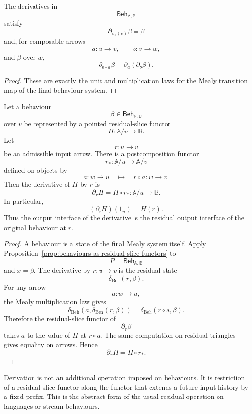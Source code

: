 \begin{proposition}
\label{prop:derivative-laws}
The derivatives in
\[
\mathsf{Beh}_{\mathbb A,\mathbb B}
\]
satisfy
\[
\partial_{e_A(v)}\beta=\beta
\]
and, for composable arrows
\[
a:u\to v,
\qquad
b:v\to w,
\]
and \(\beta\) over \(w\),
\[
\partial_{b\circ a}\beta
=
\partial_a(\partial_b\beta).
\]
\end{proposition}

\begin{proof}
These are exactly the unit and multiplication laws for the Mealy transition
map of the final behaviour system.
\end{proof}

\begin{proposition}
\label{prop:derivatives-as-residual-precomposition}
Let a behaviour
\[
\beta\in\mathsf{Beh}_{\mathbb A,\mathbb B}
\]
over \(v\) be represented by a pointed residual-slice functor
\[
H:\mathbb A/v\to\mathbb B.
\]
Let
\[
r:u\to v
\]
be an admissible input arrow. There is a postcomposition functor
\[
r_\ast:\mathbb A/u\to\mathbb A/v
\]
defined on objects by
\[
a:w\to u
\quad\longmapsto\quad
r\circ a:w\to v.
\]
Then the derivative of \(H\) by \(r\) is
\[
\partial_r H
=
H\circ r_\ast:
\mathbb A/u\to\mathbb B.
\]
In particular,
\[
(\partial_rH)(1_u)=H(r).
\]
Thus the output interface of the derivative is the residual output interface
of the original behaviour at \(r\).
\end{proposition}

\begin{proof}
A behaviour is a state of the final Mealy system itself. Apply
Proposition~\ref{prop:behaviours-as-residual-slice-functors} to
\[
P=\mathsf{Beh}_{\mathbb A,\mathbb B}
\]
and \(x=\beta\). The derivative by \(r:u\to v\) is the residual state
\[
\delta_{\mathrm{Beh}}(r,\beta).
\]
For any arrow
\[
a:w\to u,
\]
the Mealy multiplication law gives
\[
\delta_{\mathrm{Beh}}(a,\delta_{\mathrm{Beh}}(r,\beta))
=
\delta_{\mathrm{Beh}}(r\circ a,\beta).
\]
Therefore the residual-slice functor of
\[
\partial_r\beta
\]
takes \(a\) to the value of \(H\) at \(r\circ a\). The same computation on
residual triangles gives equality on arrows. Hence
\[
\partial_r H=H\circ r_\ast.
\]
\end{proof}

\begin{remark}
\label{rem:derivatives-as-residual-restriction}
Derivation is not an additional operation imposed on behaviours. It is
restriction of a residual-slice functor along the functor that extends a
future input history by a fixed prefix. This is the abstract form of the usual
residual operation on languages or stream behaviours.
\end{remark}

